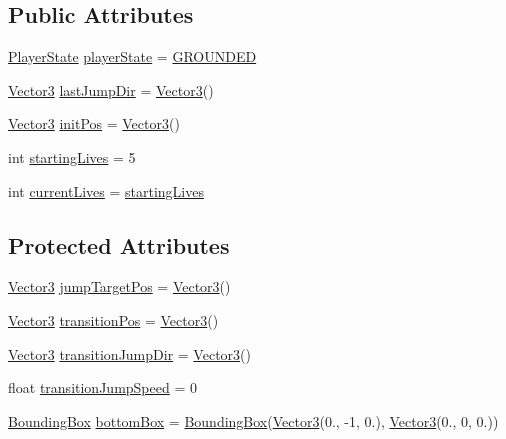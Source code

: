 \subsection*{Public Attributes}
\begin{DoxyCompactItemize}
\item 
\hyperlink{_player_8h_a3c730f37b1b3a893159bada67637fdb1}{Player\+State} \hyperlink{class_player_aea87fbb086b0cc358db8adf47bfa7369}{player\+State} = \hyperlink{_player_8h_a3c730f37b1b3a893159bada67637fdb1aefa0f3ce09b7d810dde1e3cde60f7c4f}{G\+R\+O\+U\+N\+D\+ED}
\item 
\hyperlink{class_vector3}{Vector3} \hyperlink{class_player_afef6386ca5fe8974bcc3d807b2261a09}{last\+Jump\+Dir} = \hyperlink{class_vector3}{Vector3}()
\item 
\hyperlink{class_vector3}{Vector3} \hyperlink{class_player_a6d0fe16db54a42ab13f0b8ed1ca0632c}{init\+Pos} = \hyperlink{class_vector3}{Vector3}()
\item 
int \hyperlink{class_player_a11d9ba38b586f5acfac4f2cd5233cbb4}{starting\+Lives} = 5
\item 
int \hyperlink{class_player_a6638b814a2cb74674b554d51a3e8a256}{current\+Lives} = \hyperlink{class_player_a11d9ba38b586f5acfac4f2cd5233cbb4}{starting\+Lives}
\end{DoxyCompactItemize}
\subsection*{Protected Attributes}
\begin{DoxyCompactItemize}
\item 
\hyperlink{class_vector3}{Vector3} \hyperlink{class_player_a9df1cbdc480439b69d82068b287ed071}{jump\+Target\+Pos} = \hyperlink{class_vector3}{Vector3}()
\item 
\hyperlink{class_vector3}{Vector3} \hyperlink{class_player_a6c51347e4c397febebd559c19d7969b9}{transition\+Pos} = \hyperlink{class_vector3}{Vector3}()
\item 
\hyperlink{class_vector3}{Vector3} \hyperlink{class_player_ab85f1fa829960281bfdf1171ecdbead7}{transition\+Jump\+Dir} = \hyperlink{class_vector3}{Vector3}()
\item 
float \hyperlink{class_player_af7711712d6bd0b3185f8a38f769ff3c8}{transition\+Jump\+Speed} = 0
\item 
\hyperlink{class_bounding_box}{Bounding\+Box} \hyperlink{class_player_ae86b1de018c7db9a201935a1a67e9ce0}{bottom\+Box} = \hyperlink{class_bounding_box}{Bounding\+Box}(\hyperlink{class_vector3}{Vector3}(0., -\/1, 0.), \hyperlink{class_vector3}{Vector3}(0., 0, 0.))
\end{DoxyCompactItemize}
